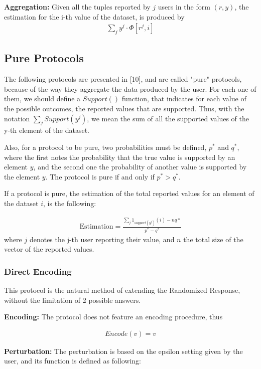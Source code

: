 \textbf{Aggregation:} Given all the tuples reported by $j$ users in the form $(r, y)$, the estimation for the i-th value of the dataset, is produced by 
\begin{align*}
\sum_{j} y^j \cdot \Phi[r^j,i]
\end{align*}

\subsection{Pure Protocols}

The following protocols are presented in [10], and are called "pure" protocols, because of the way they aggregate the data produced by the user. For each one of them, we should define a $Support()$ function, that indicates for each value of the possible outcomes, the reported values that are supported. Thus, with the notation $\sum_{j} Support(y^j)$, we mean the sum of all the supported values of the y-th element of the dataset.

Also, for a protocol to be pure, two probabilities must be defined, $p^*$ and $q^*$, where the first notes the probability that the true value is supported by an element $y$, and the second one the probability of another value is supported by the element $y$. The protocol is pure if and only if $p^* > q^*$.

If a protocol is pure, the estimation of the total reported values for an element of the dataset $i$, is the following:

\begin{align}
    \text{Estimation} = \frac{\sum_{j} 1_{support(y^j)}(i) - nq*}{p^* - q^*}
\end{align}
where $j$ denotes the j-th user reporting their value, and $n$ the total size of the vector of the reported values.


\subsubsection{Direct Encoding}

This protocol is the natural method of extending the Randomized Response, without the limitation of 2 possible answers. 

\textbf{Encoding:} The protocol does not feature an encoding procedure, thus 

\begin{align*}
    Encode(v) = v
\end{align*}

\textbf{Perturbation:} The perturbation is based on the epsilon setting given by the user, and its function is defined as following:

